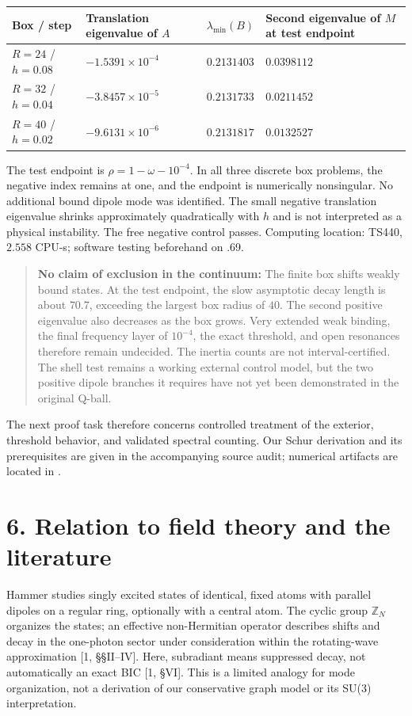 \documentclass[a4paper,11pt]{article}
\newenvironment{drafttable}{\begin{center}\small\renewcommand{\arraystretch}{1.2}}{\end{center}}
\begin{document}
\begin{drafttable}
\begin{tabularx}{\linewidth}{@{}lXXX@{}}\toprule
Box / step & Translation eigenvalue of $A$ & $\lambda_{\min}(B)$ & Second eigenvalue of $M$ at test endpoint\\\midrule
$R=24$ / $h=0.08$ & $-1.5391\times10^{-4}$ & $0.2131403$ & $0.0398112$\\
$R=32$ / $h=0.04$ & $-3.8457\times10^{-5}$ & $0.2131733$ & $0.0211452$\\
$R=40$ / $h=0.02$ & $-9.6131\times10^{-6}$ & $0.2131817$ & $0.0132527$\\\bottomrule
\end{tabularx}
\end{drafttable}
The test endpoint is $\rho=1-\omega-10^{-4}$. In all three discrete box problems, the negative index remains at one, and the endpoint is numerically nonsingular. No additional bound dipole mode was identified. The small negative translation eigenvalue shrinks approximately quadratically with $h$ and is not interpreted as a physical instability. The free negative control passes. Computing location: TS440, $2.558$ CPU-s; software testing beforehand on .69.

\begin{quote}
\textbf{No claim of exclusion in the continuum:} The finite box shifts weakly bound states. At the test endpoint, the slow asymptotic decay length is about $70.7$, exceeding the largest box radius of $40$. The second positive eigenvalue also decreases as the box grows. Very extended weak binding, the final frequency layer of $10^{-4}$, the exact threshold, and open resonances therefore remain undecided. The inertia counts are not interval-certified. The shell test remains a working external control model, but the two positive dipole branches it requires have not yet been demonstrated in the original Q-ball.
\end{quote}

The next proof task therefore concerns controlled treatment of the exterior, threshold behavior, and validated spectral counting. Our Schur derivation and its prerequisites are given in the accompanying source audit; numerical artifacts are located in .

\section*{6. Relation to field theory and the literature}
Hammer studies singly excited states of identical, fixed atoms with parallel dipoles on a regular ring, optionally with a central atom. The cyclic group $\mathbb Z_N$ organizes the states; an effective non-Hermitian operator describes shifts and decay in the one-photon sector under consideration within the rotating-wave approximation [1, \S\S II--IV]. Here, subradiant means suppressed decay, not automatically an exact BIC [1, \S VI]. This is a limited analogy for mode organization, not a derivation of our conservative graph model or its SU(3) interpretation.
\end{document}
